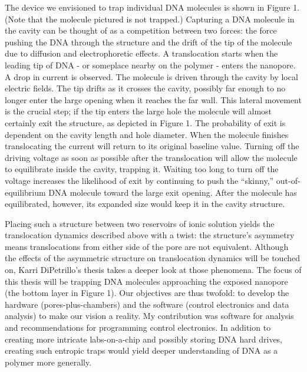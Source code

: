 \documentclass[aps,prl,preprint,groupedaddress]{revtex4}
\begin{document}
The device we envisioned to trap individual DNA molecules is shown in Figure 1. (Note that the molecule pictured is not trapped.) Capturing a DNA molecule in the cavity can be thought of as a competition between two forces: the force pushing the DNA through the structure and the drift of the tip of the molecule due to diffusion and electrophoretic effects. A translocation starts when the leading tip of DNA  - or someplace nearby on the polymer - enters the nanopore. A drop in current is observed. The molecule is driven through the cavity by local electric fields. The tip drifts as it crosses the cavity, possibly far enough to no longer enter the large opening when it reaches the far wall. This lateral movement is the crucial step; if the tip enters the large hole the molecule will almost certainly exit the structure, as depicted in Figure 1. The probability of exit is dependent on the cavity length and hole diameter. When the molecule finishes translocating the current will return to its original baseline value. Turning off the driving voltage as soon as possible after the translocation will allow the molecule to equilibrate inside the cavity, trapping it. Waiting too long to turn off the voltage increases the likelihood of exit by continuing to push the “skinny,” out-of-equilibrium DNA molecule toward the large exit opening. After the molecule has equilibrated, however, its expanded size would keep it in the cavity structure. 

Placing such a structure between two reservoirs of ionic solution yields the translocation dynamics described above with a twist: the structure’s asymmetry means translocations from either side of the pore are not equivalent. Although the effects of the asymmetric structure on translocation dynamics will be touched on, Karri DiPetrillo’s thesis takes a deeper look at those phenomena. The focus of this thesis will be trapping DNA molecules approaching the exposed nanopore (the bottom layer in Figure 1). Our objectives are thus twofold: to develop the hardware (pores-plus-chambers) and the software (control electronics and data analysis) to make our vision a reality. My contribution was software for analysis and recommendations for programming control electronics. In addition to creating more intricate labs-on-a-chip and possibly storing DNA hard drives, creating such entropic traps would yield deeper understanding of DNA as a polymer more generally. 
\end{document}

